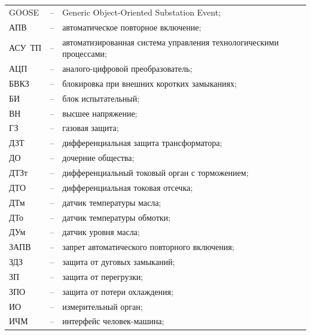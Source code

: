 \documentclass[a4paper, 12pt,table, hidelinks, DIV=calc]{extarticle} %
\begin{document}
\thispagestyle{plain} %





\color{uniblue}{\tableofcontents}
\color{black}

\clearpage
\newpage
{}
\color{uniblue}\section*{}
\color{black}
\begin{longtable}{>{\raggedright\arraybackslash}m{2cm}>{\raggedright\arraybackslash}m{0.5cm}>{\raggedright\arraybackslash}m{20cm}}
\endfirsthead\endhead\endfoot\endlastfoot
GOOSE & -- & Generic Object-Oriented Substation Event; \\
АПВ & -- & автоматическое повторное включение; \\
АСУ~ТП & -- & автоматизированная система управления технологическими процессами; \\
АЦП & -- & аналого-цифровой преобразователь; \\
БВКЗ & -- & блокировка при внешних коротких замыканиях; \\
БИ & -- & блок испытательный; \\
ВН & -- & высшее напряжение; \\
ГЗ & -- & газовая защита; \\
ДЗТ & -- & дифференциальная защита трансформатора; \\
ДО & -- & дочерние общества; \\
ДТЗт & -- & дифференциальный токовый орган с торможением; \\
ДТО & -- & дифференциальная токовая отсечка; \\
ДТм & -- & датчик температуры масла; \\
ДТо & -- & датчик температуры обмотки; \\
ДУм & -- & датчик уровня масла; \\
ЗАПВ & -- & запрет автоматического повторного включения; \\
ЗДЗ & -- & защита от дуговых замыканий; \\
ЗП & -- & защита от перегрузки; \\
ЗПО & -- & защита от потери охлаждения; \\
ИО & -- & измерительный орган; \\
ИЧМ & -- & интерфейс человек-машина; \\

\end{longtable}
\end{document}
